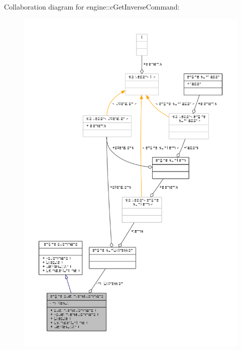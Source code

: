 Collaboration diagram for engine\-:\-:c\-Get\-Inverse\-Command\-:
\nopagebreak
\begin{figure}[H]
\begin{center}
\leavevmode
\includegraphics[width=350pt]{classengine_1_1cGetInverseCommand__coll__graph}
\end{center}
\end{figure}
